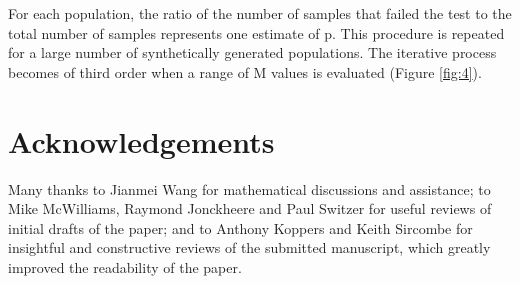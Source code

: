 \documentclass[12]{article}
\begin{document}
For each  population, the ratio of  the number of  samples that failed
the test to the total number  of samples represents one estimate of p.
This  procedure  is  repeated  for  a large  number  of  synthetically
generated populations.  The iterative  process becomes of  third order
when a range of M values is evaluated (Figure \ref{fig:4}).

\section*{Acknowledgements}

Many  thanks   to  Jianmei  Wang  for   mathematical  discussions  and
assistance; to  Mike McWilliams,  Raymond Jonckheere and  Paul Switzer
for  useful reviews of  initial drafts  of the  paper; and  to Anthony
Koppers and Keith Sircombe  for insightful and constructive reviews of
the submitted  manuscript, which  greatly improved the  readability of
the paper.
\end{document}
